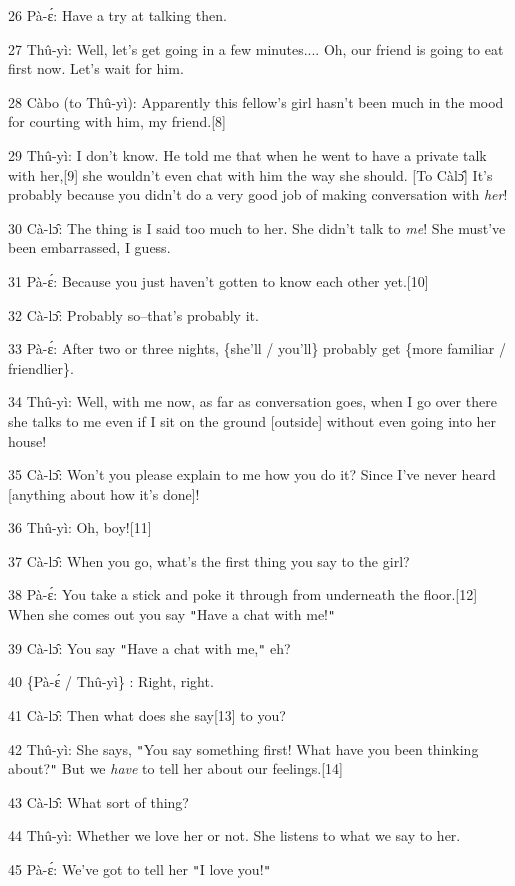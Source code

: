 26 Pà-ɛ́: Have a try at talking then.

27 Thû-yì: Well, let's get going in a few minutes.... Oh, our friend is going
to eat first now. Let's wait for him.

28  Càbo (to Thû-yì): Apparently this fellow's girl hasn't been much in the
mood for courting with him, my friend.[8]

29 Thû-yì: I don't know. He told me that when he went to have a private talk
with her,[9] she wouldn't even chat with him the way she should. [To Càlɔ̂]
It's probably because you didn't do a very good job of making conversation with
\textit{her}!

30 Cà-lɔ̂: The thing is I said too much to her. She didn't talk to\textit{ me}!
She must've been embarrassed, I guess.

31 Pà-ɛ́: Because you just haven't gotten to know each other yet.[10]

32 Cà-lɔ̂: Probably so--that's probably it.

33 Pà-ɛ́: After two or three nights, \{she'll / you'll\} probably get \{more
familiar / friendlier\}.

34 Thû-yì: Well, with me now, as far as conversation goes, when I go over there
she talks to me even if I sit on the ground [outside] without even going into her
house!

35 Cà-lɔ̂: Won't you please explain to me how you do it? Since I've never heard
[anything about how it's done]!

36 Thû-yì: Oh, boy![11]

37 Cà-lɔ̂: When you go, what's the first thing you say to the girl?

38 Pà-ɛ́: You take a stick and poke it through from underneath the floor.[12]
When she comes out you say \texttt{"}Have a chat with me!\texttt{"}

39 Cà-lɔ̂: You say \texttt{"}Have a chat with me,\texttt{"} eh?

40 \{Pà-ɛ́ / Thû-yì\} : Right, right.

41 Cà-lɔ̂: Then what does she say[13] to you?

42 Thû-yì: She says, \texttt{"}You say something first! What have you been thinking
about?\texttt{"} But we \textit{have} to tell her about our feelings.[14]

43 Cà-lɔ̂: What sort of thing?

44 Thû-yì: Whether we love her or not. She listens to what we say to her.

45 Pà-ɛ́: We've got to tell her \texttt{"}I love you!\texttt{"}

